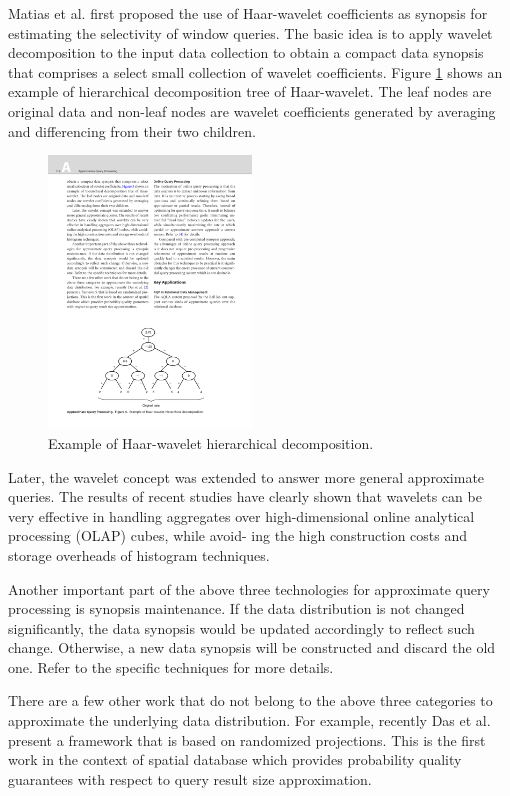 \documentclass[twocolumn]{article}
\begin{document}
Matias et al. \cite{Matias:1998} first proposed the use of Haar-wavelet coefficients as synopsis for estimating the selectivity of window queries. The basic idea is to apply wavelet decomposition to the input data collection to obtain a compact data synopsis that comprises a select small collection of wavelet coefficients. 
Figure \ref{fig:wavelet} shows an example of hierarchical decomposition tree of Haar-wavelet. The leaf nodes are original data and non-leaf nodes are wavelet coefficients generated by averaging and differencing from their two children.
\begin{figure}[htb]
        \centering
        \includegraphics[width=0.48\textwidth]{wavelet-example.pdf}
        \caption{Example of Haar-wavelet hierarchical decomposition.}
        \label{fig:wavelet}
\end{figure}

Later, the wavelet concept was extended to answer more general approximate queries. The results of recent studies have clearly shown that wavelets can be very effective in handling aggregates over high-dimensional online analytical processing (OLAP) cubes, while avoid- ing the high construction costs and storage overheads of histogram techniques.

Another important part of the above three technologies for approximate query processing is synopsis maintenance. If the data distribution is not changed significantly, the data synopsis would be updated accordingly to reflect such change. Otherwise, a new data synopsis will be constructed and discard the old one. Refer to the specific techniques for more details.

There are a few other work that do not belong to the above three categories to approximate the underlying data distribution. 
For example, recently Das et al. \cite{Das:2004} present a framework that is based on randomized projections. This is the first work in the context of spatial database which provides probability quality guarantees with respect to query result size approximation.
\end{document}
